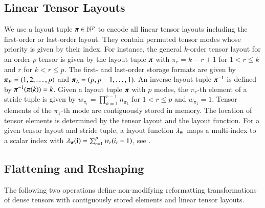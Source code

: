 \subsection{Linear Tensor Layouts}
\label{sec:preliminaries:layout}
We use a layout tuple $\boldsymbol{\pi} \in \mathbb{N}^p$ to encode all linear tensor layouts including the first-order or last-order layout.
They contain permuted tensor modes whose priority is given by their index.
For instance, the general $k$-order tensor layout for an order-$p$ tensor is given by the layout tuple $\boldsymbol{\pi}$ with $\pi_r = k-r+1$ for $1 < r \leq k$ and $r$ for $k < r \leq p$.
The first- and last-order storage formats are given by $\boldsymbol{\pi}_F = (1,2,\dots,p)$ and $\boldsymbol{\pi}_{L} = (p,p-1,\dots,1)$.
An inverse layout tuple $\boldsymbol{\pi}^{-1}$ is defined by $\boldsymbol{\pi}^{-1}(\boldsymbol{\pi}(k)) = k$.
Given a layout tuple $\boldsymbol{\pi}$ with $p$ modes, the $\pi_r$-th element of a stride tuple is given by $w_{\pi_r} = \prod_{k=1}^{r-1} n_{\pi_k}$ for $1 < r \leq p$ and $w_{\pi_1} = 1$.
Tensor elements of the $\pi_1$-th mode are contiguously stored in memory.
The location of tensor elements is determined by the tensor layout and the layout function.
For a given tensor layout and stride tuple, a layout function $\lambda_{\mathbf{w}}$ maps a multi-index to a scalar index with $\lambda_{\mathbf{w}}(\mathbf{i}) = \sum_{r=1}^p w_r (i_r-1)$, see \cite{bassoy:2018:fast,pawlowski:2019:morton.tensor.computations}.

\subsection{Flattening and Reshaping}
\label{sec:preliminaries:flattening.reshaping}
The following two operations define non-modifying reformatting transformations of dense tensors with contiguously stored elements and linear tensor layouts.

